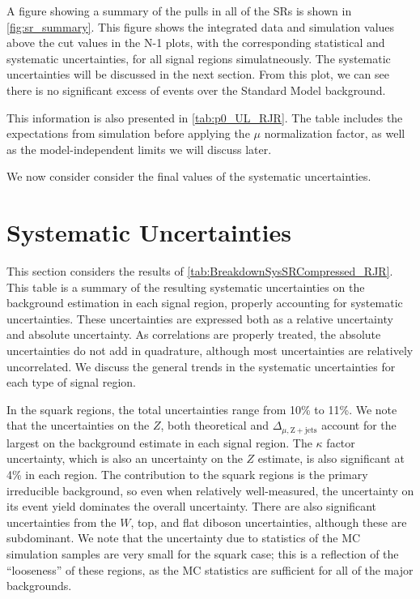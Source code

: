 A figure showing a summary of the pulls in all of the SRs is shown in \ref{fig:sr_summary}.
This figure shows the integrated data and simulation values above the cut values in the N-1 plots, with the corresponding statistical and systematic uncertainties, for all signal regions simulatneously.
The systematic uncertainties will be discussed in the next section.
From this plot, we can see there is no significant excess of events over the Standard Model background.

This information is also presented in \ref{tab:p0_UL_RJR}.
The table includes the expectations from simulation before applying the $\mu$ normalization factor, as well as the model-independent limits we will discuss later.

We now consider consider the final values of the systematic uncertainties.

\section{Systematic Uncertainties}

This section considers the results of \ref{tab:BreakdownSysSRCompressed_RJR}.
This table is a summary of the resulting systematic uncertainties on the background estimation in each signal region, properly accounting for systematic uncertainties.
These uncertainties are expressed both as a relative uncertainty and absolute uncertainty.
As correlations are properly treated, the absolute uncertainties do not add in quadrature, although most uncertainties are relatively uncorrelated.
We discuss the general trends in the systematic uncertainties for each type of signal region.

In the squark regions, the total uncertainties range from 10\% to 11\%.
We note that the uncertainties on the $Z$, both theoretical and $\Delta_{\mu,\mathrm{Z+jets}}$ account for the largest on the background estimate in each signal region.
The $\kappa$ factor uncertainty, which is also an uncertainty on the $Z$ estimate, is also significant at 4\% in each region.
The \Zvv contribution to the squark regions is the primary irreducible background, so even when relatively well-measured, the uncertainty on its event yield dominates the overall uncertainty.
There are also significant uncertainties from the $W$, top, and flat diboson uncertainties, although these are subdominant.
We note that the uncertainty due to statistics of the MC simulation samples are very small for the squark case; this is a reflection of the ``looseness'' of these regions, as the MC statistics are sufficient for all of the major backgrounds.

